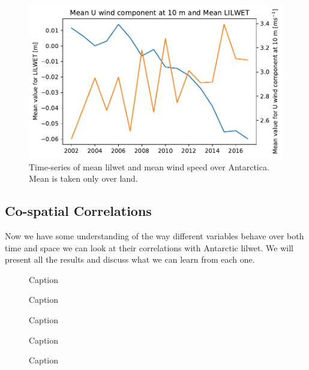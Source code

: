 \documentclass[../main.tex]{subfiles}
\begin{document}
\begin{figure}[!hbt]
    \centering
    \includegraphics{images/2021w5/chapter7/hres/tiemseries_u_10}
    \caption{Time-series of mean \gls{lilwet} and mean wind speed over Antarctica. Mean is taken only over land.}
    \label{fig:timeseries_u_10}
\end{figure}

\subsection{Co-spatial Correlations}
Now we have some understanding of the way different variables behave over both time and space we can look at their correlations with Antarctic \gls{lilwet}. We will present all the results and discuss what we can learn from each one.

\begin{figure}[!hbt]
    \centering
    \caption{Caption}
    \label{fig:my_label}
\end{figure}
\begin{figure}[!hbt]
    \centering
    \caption{Caption}
    \label{fig:my_label}
\end{figure}
\begin{figure}[!hbt]
    \centering
    \caption{Caption}
    \label{fig:my_label}
\end{figure}
\begin{figure}[!hbt]
    \centering
    \caption{Caption}
    \label{fig:my_label}
\end{figure}
\begin{figure}[!hbt]
    \centering
    \caption{Caption}
    \label{fig:my_label}
\end{figure}
\end{document}
